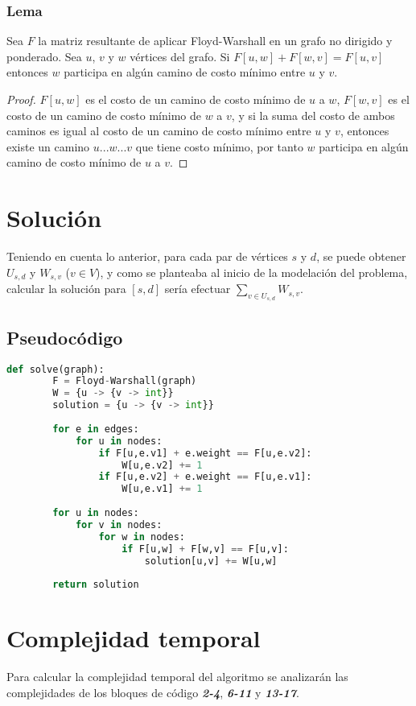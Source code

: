 \documentclass{article}
\begin{document}
\subsubsection*{Lema}
Sea $F$ la matriz resultante de aplicar Floyd-Warshall en un grafo no dirigido y ponderado.
Sea $u$, $v$ y $w$ vértices del grafo. Si $F[u,w] + F[w,v] = F[u,v]$ entonces $w$ participa en algún camino
de costo mínimo entre $u$ y $v$.

\begin{proof}
    $F[u,w]$ es el costo de un camino de costo mínimo de $u$ a $w$, 
    $F[w,v]$ es el costo de un camino de costo mínimo de $w$ a $v$, y si la suma del costo de ambos caminos es 
    igual al costo de un camino de costo mínimo entre $u$ y $v$, entonces existe un camino $u...w...v$ que tiene costo
    mínimo, por tanto $w$ participa en algún camino de costo mínimo de $u$ a $v$. 
\end{proof}

\section*{Solución}
Teniendo en cuenta lo anterior, para cada par de vértices $s$ y $d$, se puede obtener $U_{s,d}$ y $W_{s,v}$ ($v \in V$), y
como se planteaba al inicio de la modelación del problema, calcular la solución para $[s,d]$ sería efectuar
$\sum_{v \in U_{s,d}}W_{s,v}$.

\subsection*{Pseudocódigo}
\begin{lstlisting}[language = Python]
    def solve(graph):
        F = Floyd-Warshall(graph)
        W = {u -> {v -> int}}
        solution = {u -> {v -> int}}
        
        for e in edges:
            for u in nodes:
                if F[u,e.v1] + e.weight == F[u,e.v2]:
                    W[u,e.v2] += 1
                if F[u,e.v2] + e.weight == F[u,e.v1]:
                    W[u,e.v1] += 1
        
        for u in nodes:
            for v in nodes:
                for w in nodes:
                    if F[u,w] + F[w,v] == F[u,v]:
                        solution[u,v] += W[u,w]
        
        return solution
\end{lstlisting}

\section*{Complejidad temporal}
Para calcular la complejidad temporal del algoritmo se analizarán las complejidades 
de los bloques de código \textbf{\textit{2-4}}, \textbf{\textit{6-11}} y \textbf{\textit{13-17}}.
\end{document}
